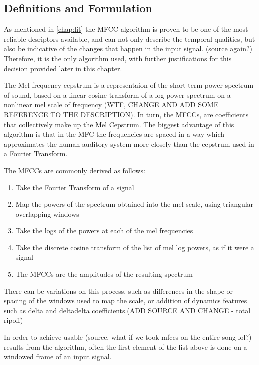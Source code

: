 \subsection{Definitions and Formulation}

As mentioned in \autoref{chap:lit} the MFCC algorithm is proven to be
one of the most reliable desriptors available, and can not only
describe the temporal qualities, but also be indicative of the changes
that happen in the input signal. (source again?) Therefore, it is the
only algorithm used, with further justifications for this decision
provided later in this chapter.

The Mel-frequency cepstrum is a representaion of the short-term power
spectrum of sound, based on a linear cosine transform of a log power
spectrum on a nonlinear mel scale of frequency (WTF, CHANGE AND ADD
SOME REFERENCE TO THE DESCRIPTION). In turn, the MFCCs, are
coefficients that collectively make up the Mel Cepstrum. The biggest
advantage of this algorithm is that in the MFC the frequencies are
spaced in a way which approximates the human auditory system more
closely than the cepstrum used in a Fourier Transform. 

The MFCCs are commonly derived as follows:

\begin{enumerate}
\item{Take the Fourier Transform of a signal}
\item{Map the powers of the spectrum obtained into the mel scale,
    using triangular overlapping windows}
\item{Take the logs of the powers at each of the mel frequencies}
\item{Take the discrete cosine transform of the list of mel log
    powers, as if it were a signal}
  \item{The MFCCs are the amplitudes of the resulting spectrum}
\end{enumerate}

There can be variations on this process, such as differences in the
shape or spacing of the windows used to map the scale, or addition of
dynamics features such as delta and deltadelta coefficients.(ADD
SOURCE AND CHANGE - total ripoff)

In order to achieve  usable (source, what if we took mfccs on the
entire song lol?) results from the algorithm, often the first element
of the list above is done on a windowed frame of an input signal.


